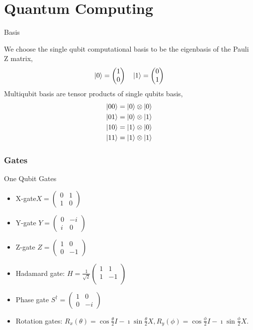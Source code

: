 \documentclass{beamer}
\begin{document}
\section{Quantum Computing}
\begin{frame}{Basis}

We choose the single qubit computational basis to be the eigenbasis of the Pauli Z matrix,
\[ \ket{0} = \begin{pmatrix} 1 \\ 0 \end{pmatrix} \quad \ket{1} = \begin{pmatrix} 0 \\ 1 \end{pmatrix}  \] 	
Multiqubit basis are tensor products of single qubits basis,
\[ 
\begin{aligned}
	\ket{00} = \ket{0} \otimes \ket{0} \\
	\ket{01} = \ket{0} \otimes \ket{1} \\
	\ket{10} = \ket{1} \otimes \ket{0} \\
	\ket{11} = \ket{1} \otimes \ket{1}
\end{aligned}
\] 
\end{frame}


\begin{frame}[t]
	\frametitle{Gates}	

\begin{block}{One Qubit Gates}
	\begin{itemize}
		\item X-gate$ X = \begin{pmatrix} 0 & 1 \\ 1 & 0 \end{pmatrix}  $ 
		\item Y-gate $ Y = \begin{pmatrix} 0 & -i \\ i & 0 \end{pmatrix}  $ 
		\item Z-gate $ Z = \begin{pmatrix} 1 & 0 \\ 0 & -1 \end{pmatrix}  $ 
		\item Hadamard gate: $ H = \frac{1}{\sqrt{2}} \begin{pmatrix} 1 & 1 \\ 1 & -1 \\ \end{pmatrix} $ 
		\item Phase gate $ S^{\dagger} = \begin{pmatrix} 1 & 0 \\ 0 & -i \end{pmatrix} $ 
		\item Rotation gates: $R_x(\theta)=\cos{\frac{\theta}{2}}I-\imath \sin{\frac{\theta}{2}}X, R_y(\phi)=\cos{\frac{\phi}{2}}I-\imath \sin{\frac{\phi}{2}}X.$
	\end{itemize}
\end{block}
\end{frame}
\end{document}
